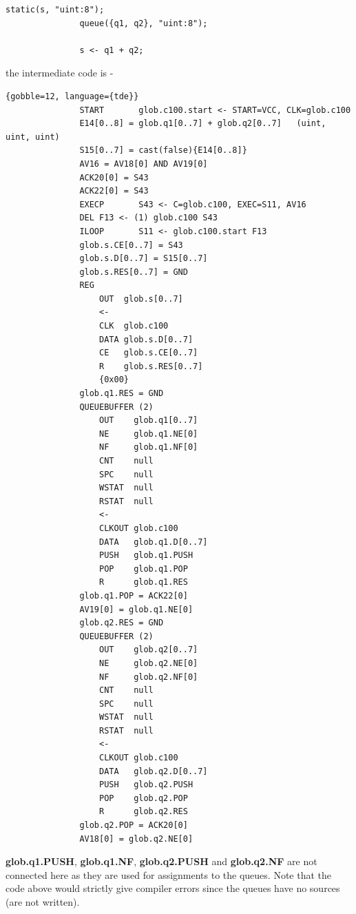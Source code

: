             \begin{lstlisting}[gobble=12, language=threepl]
               static(s, "uint:8");
               queue({q1, q2}, "uint:8");

               s <- q1 + q2;
            \end{lstlisting}
            the intermediate code is -
            \begin{lstlisting}{gobble=12, language={tde}}
               START       glob.c100.start <- START=VCC, CLK=glob.c100
               E14[0..8] = glob.q1[0..7] + glob.q2[0..7]   (uint, uint, uint)
               S15[0..7] = cast(false){E14[0..8]}
               AV16 = AV18[0] AND AV19[0]
               ACK20[0] = S43
               ACK22[0] = S43
               EXECP       S43 <- C=glob.c100, EXEC=S11, AV16
               DEL F13 <- (1) glob.c100 S43
               ILOOP       S11 <- glob.c100.start F13
               glob.s.CE[0..7] = S43
               glob.s.D[0..7] = S15[0..7]
               glob.s.RES[0..7] = GND
               REG
                   OUT  glob.s[0..7]
                   <-
                   CLK  glob.c100
                   DATA glob.s.D[0..7]
                   CE   glob.s.CE[0..7]
                   R    glob.s.RES[0..7]
                   {0x00}
               glob.q1.RES = GND
               QUEUEBUFFER (2)
                   OUT    glob.q1[0..7]
                   NE     glob.q1.NE[0]
                   NF     glob.q1.NF[0]
                   CNT    null
                   SPC    null
                   WSTAT  null
                   RSTAT  null
                   <-
                   CLKOUT glob.c100
                   DATA   glob.q1.D[0..7]
                   PUSH   glob.q1.PUSH
                   POP    glob.q1.POP
                   R      glob.q1.RES
               glob.q1.POP = ACK22[0]
               AV19[0] = glob.q1.NE[0]
               glob.q2.RES = GND
               QUEUEBUFFER (2)
                   OUT    glob.q2[0..7]
                   NE     glob.q2.NE[0]
                   NF     glob.q2.NF[0]
                   CNT    null
                   SPC    null
                   WSTAT  null
                   RSTAT  null
                   <-
                   CLKOUT glob.c100
                   DATA   glob.q2.D[0..7]
                   PUSH   glob.q2.PUSH
                   POP    glob.q2.POP
                   R      glob.q2.RES
               glob.q2.POP = ACK20[0]
               AV18[0] = glob.q2.NE[0]
            \end{lstlisting}
            {\bf glob.q1.PUSH}, {\bf glob.q1.NF}, {\bf glob.q2.PUSH} and {\bf
            glob.q2.NF} are not connected here as they are used for assignments
            to the queues. Note that the code above would strictly give compiler
            errors since the queues have no sources (are not written). 
      
